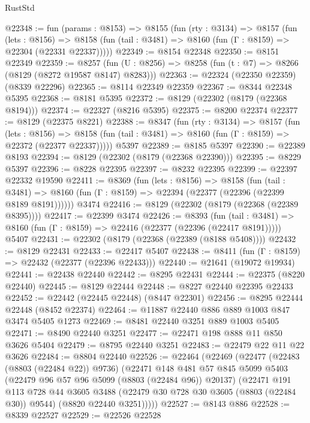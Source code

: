\begin{lexlean}{RustStd}
\begin{coremodule}
@22348 := fun (params : @8153) =>
  @8155
    (fun (rty : @3134) =>
    @8157
      (fun (lets : @8156) =>
      @8158 (fun (tail : @3481) => @8160 (fun (Γ : @8159) => @22304 (@22331 @22337)))))
@22349 := @8154 @22348
@22350 := @8151 @22349
@22359 := @8257
    (fun (U : @8256) => @8258 (fun (t : @7) => @8266 (@8129 (@8272 @19587 @8147) @8283)))
@22363 := @22324 (@22350 @22359) (@8339 @22296)
@22365 := @8114 @22349 @22359
@22367 := @8344 @22348 @5395
@22368 := @8181 @5395
@22372 := @8129 (@22302 (@8179 (@22368 @8194)))
@22374 := @22327 (@8216 @5395)
@22375 := @8200 @22374
@22377 := @8129 (@22375 @8221)
@22388 := @8347
    (fun (rty : @3134) =>
    @8157
      (fun (lets : @8156) =>
      @8158 (fun (tail : @3481) => @8160 (fun (Γ : @8159) => @22372 (@22377 @22337)))))
    @5397
@22389 := @8185 @5397
@22390 := @22389 @8193
@22394 := @8129 (@22302 (@8179 (@22368 @22390)))
@22395 := @8229 @5397
@22396 := @8228 @22395
@22397 := @8232 @22395
@22399 := @22397 @22332 @19590
@22411 := @8369
    (fun (lets : @8156) =>
    @8158
      (fun (tail : @3481) =>
      @8160 (fun (Γ : @8159) => @22394 (@22377 (@22396 (@22399 @8189 @8191))))))
    @3474
@22416 := @8129 (@22302 (@8179 (@22368 (@22389 @8395))))
@22417 := @22399 @3474
@22426 := @8393
    (fun (tail : @3481) => @8160 (fun (Γ : @8159) => @22416 (@22377 (@22396 (@22417 @8191)))))
    @5407
@22431 := @22302 (@8179 (@22368 (@22389 (@8188 @5408))))
@22432 := @8129 @22431
@22433 := @22417 @5407
@22438 := @8411 (fun (Γ : @8159) => @22432 (@22377 (@22396 @22433)))
@22440 := @21641 (@19072 @19934)
@22441 := @22438 @22440
@22442 := @8295 @22431
@22444 := @22375 (@8220 @22440)
@22445 := @8129 @22444
@22448 := @8227 @22440 @22395 @22433
@22452 := @22442 (@22445 @22448) (@8447 @22301)
@22456 := @8295 @22444 @22448 (@8452 @22374)
@22464 := @11887 @22440 @886 @889 @1003 @847 @3474 @5405 @1273
@22469 := @8481 @22440 @3251 @889 @1003 @5405
@22471 := @8490 @22440 @3251
@22477 := @22471 @198 @888 @11 @850 @3626 @5404
@22479 := @8795 @22440 @3251
@22483 := @22479 @22 @11 @22 @3626
@22484 := @8804 @22440
@22526 := @22464
    (@22469
      (@22477
        (@22483 (@8803 (@22484 @22)) @9736)
        (@22471
          @148
          @481
          @57
          @845
          @5099
          @5403
          (@22479 @96 @57 @96 @5099 (@8803 (@22484 @96)) @20137)
          (@22471
            @191
            @113
            @728
            @44
            @3605
            @3488
            (@22479 @30 @728 @30 @3605 (@8803 (@22484 @30)) @9544)
            (@8820 @22440 @3251)))))
@22527 := @8143 @886
@22528 := @8339 @22527
@22529 := @22526 @22528

\end{coremodule}
\end{lexlean}
